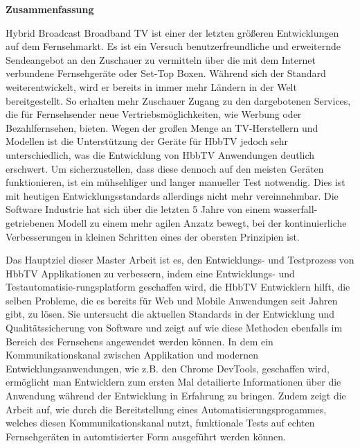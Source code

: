 
\thispagestyle{empty}
\vspace*{0.2cm}

\begin{center}
    \textbf{Zusammenfassung}
\end{center}

\vspace*{0.2cm}

\noindent

Hybrid Broadcast Broadband TV ist einer der letzten größeren Entwicklungen auf dem Fernsehmarkt.
Es ist ein Versuch benutzerfreundliche und erweiternde Sendeangebot an den Zuschauer zu vermitteln
über die mit dem Internet verbundene Fernsehgeräte oder Set-Top Boxen. Während sich der Standard
weiterentwickelt, wird er bereits in immer mehr Ländern in der Welt bereitgestellt. So erhalten
mehr Zuschauer Zugang zu den dargebotenen Services, die für Fernsehsender neue Vertriebsmöglichkeiten,
wie Werbung oder Bezahlfernsehen, bieten. Wegen der großen Menge an TV-Herstellern und Modellen ist
die Unterstützung der Geräte für HbbTV jedoch sehr unterschiedlich, was die Entwicklung von HbbTV
Anwendungen deutlich erschwert. Um sicherzustellen, dass diese dennoch auf den meisten Geräten
funktionieren, ist ein mühsehliger und langer manueller Test notwendig. Dies ist mit heutigen
Entwicklungsstandards allerdings nicht mehr vereinnehmbar. Die Software Industrie hat sich über die
letzten 5 Jahre von einem wasserfall-getriebenen Modell zu einem mehr agilen Anzatz bewegt, bei der
kontinuierliche Verbesserungen in kleinen Schritten eines der obersten Prinzipien ist.

Das Hauptziel dieser Master Arbeit ist es, den Entwicklungs- und Testprozess von HbbTV Applikationen
zu verbessern, indem eine Entwicklungs- und Testautomatisie-rungsplatform geschaffen wird, die
HbbTV Entwicklern hilft, die selben Probleme, die es bereits für Web und Mobile Anwendungen
seit Jahren gibt, zu lösen. Sie untersucht die aktuellen Standards in der Entwicklung und
Qualitätssicherung von Software und zeigt auf wie diese Methoden ebenfalls im Bereich des
Fernsehens angewendet werden können. In dem ein Kommunikationskanal zwischen Applikation und
modernen Entwicklungsanwendungen, wie z.B. den Chrome DevTools, geschaffen wird, ermöglicht
man Entwicklern zum ersten Mal detailierte Informationen über die Anwendung während der
Entwicklung in Erfahrung zu bringen. Zudem zeigt die Arbeit auf, wie durch die Bereitstellung
eines Automatisierungsprogammes, welches diesen Kommunikationskanal nutzt, funktionale Tests
auf echten Fernsehgeräten in automtisierter Form ausgeführt werden können.

